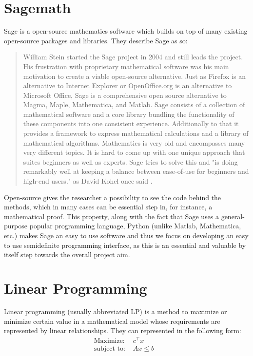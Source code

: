  



\section{Sagemath}
\label{sage}
Sage is a open-source mathematics software which builds on top of many existing open-source packages and libraries. They describe Sage as so:
\begin{quotation}
William Stein started the Sage project in 2004 and still leads the project. His frustration with proprietary mathematical software was his main motivation to create a viable open-source alternative. Just as Firefox is an alternative to Internet Explorer or OpenOffice.org is an alternative to Microsoft Office, Sage is a comprehensive open source alternative to Magma, Maple, Mathematica, and Matlab.
Sage consists of a collection of mathematical software and a core library bundling the functionality of these components into one consistent experience. Additionally to that it provides a framework to express mathematical calculations and a library of mathematical algorithms.
Mathematics is very old and encompasses many very different topics. It is hard to come up with one unique approach that suites beginners as well as experts. Sage tries to solve this and "is doing remarkably well at keeping a balance between ease-of-use for beginners and high-end users." as David Kohel once said  \cite{sagepress}. 
\end{quotation}

Open-source gives the researcher a possibility to see the code behind the methods, which in many cases can be essential step in, for instance, a mathematical proof. This property, along with the fact that Sage uses a general-purpose popular programming language, Python (unlike Matlab, Mathematica, etc.) makes Sage an easy to use software and thus we focus on developing an easy to use semidefinite programming interface, as this is an essential and valuable by itself step towards the overall project aim.

\section{Linear Programming}
\label{lp}
Linear programming (usually abbreviated LP) is a method to maximize or minimize certain value in a mathematical model whose requirements are represented by linear relationships. They can represented in the following form:
\begin{align}
\text{Maximize: } &c^{\top}x& \\
\text{subject to: } &Ax \leq b& \\
\end{align} 

